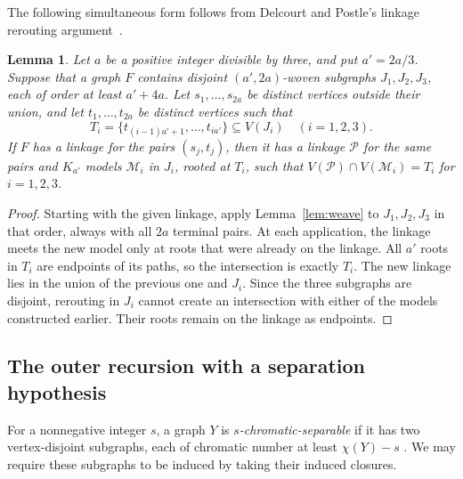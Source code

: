 \documentclass[11pt]{article}
\newtheorem{lemma}[theorem]{Lemma}
\begin{document}
The following simultaneous form follows from Delcourt and Postle's
linkage rerouting argument~\cite[Claim~7.1.1]{DP}.
\begin{lemma}
\label{lem:simultaneous}
Let $a$ be a positive integer divisible by three, and put $a'=2a/3$.
Suppose that a graph $F$ contains disjoint $(a',2a)$-woven subgraphs
$J_1,J_2,J_3$, each of order at least $a'+4a$.
Let $s_1,\ldots,s_{2a}$ be distinct vertices outside their union, and
let $t_1,\ldots,t_{2a}$ be distinct vertices such that
\[
 T_i=\{t_{(i-1)a'+1},\ldots,t_{ia'}\}\subseteq V(J_i)
 \quad(i=1,2,3).
\]
If $F$ has a linkage for the pairs $(s_j,t_j)$, then it has a linkage
$\mathcal P$ for the same pairs and $K_{a'}$ models $\mathcal M_i$
in $J_i$, rooted at $T_i$, such that
$V(\mathcal P)\cap V(\mathcal M_i)=T_i$ for $i=1,2,3$.
\end{lemma}
\begin{proof}
Starting with the given linkage, apply Lemma~\ref{lem:weave} to
$J_1,J_2,J_3$ in that order, always with all $2a$ terminal pairs.
At each application, the linkage meets the new model only at roots
that were already on the linkage. All $a'$ roots in $T_i$ are
endpoints of its paths, so the intersection is exactly $T_i$.
The new linkage lies in the union of the previous one and $J_i$.
Since the three subgraphs are disjoint, rerouting in $J_i$ cannot
create an intersection with either of the models constructed earlier.
Their roots remain on the linkage as endpoints.
\end{proof}

\subsection{The outer recursion with a separation hypothesis}

For a nonnegative integer $s$, a graph $Y$ is
\emph{$s$-chromatic-separable} if it has two vertex-disjoint subgraphs,
each of chromatic number at least $\chi(Y)-s$
\cite[Definition~2.4]{DP}. We may require these subgraphs to be induced
by taking their induced closures.
\end{document}

